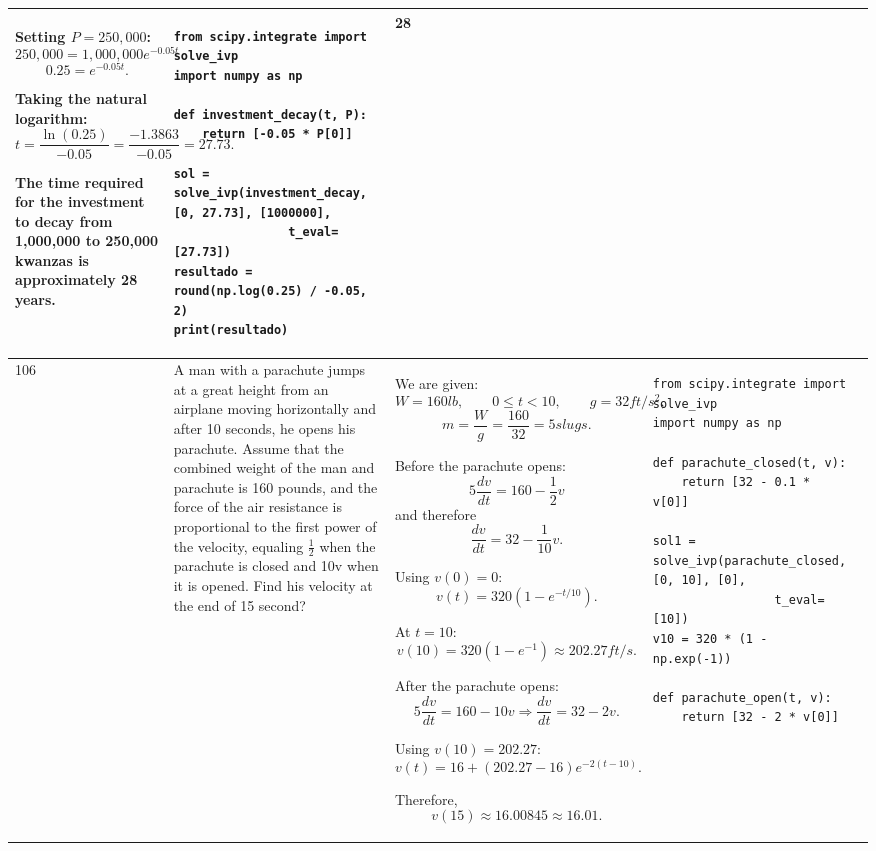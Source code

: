 \documentclass[a4paper,12pt]{article}
\begin{document}
\begin{longtable}{|p{0.3cm}|p{}|p{10cm}|p{}|p{1.5cm}|}
Setting \(P=250,000\):
\[
250,000=1,000,000e^{-0.05t}
\]
\[
0.25=e^{-0.05t}.
\]

Taking the natural logarithm:
\[
t=\frac{\ln(0.25)}{-0.05}
=\frac{-1.3863}{-0.05}
=27.73.
\]

The time required for the investment to decay from 1,000,000 to 250,000 kwanzas is approximately 28 years. &
\begin{verbatim}
from scipy.integrate import solve_ivp
import numpy as np

def investment_decay(t, P):
    return [-0.05 * P[0]]

sol = solve_ivp(investment_decay, [0, 27.73], [1000000],
                t_eval=[27.73])
resultado = round(np.log(0.25) / -0.05, 2)
print(resultado)
\end{verbatim}
& 28 \\ \hline

106 & A man with a parachute jumps at a great height from an airplane moving horizontally and after 10 seconds, he opens his parachute. Assume that the combined weight of the man and parachute is 160 pounds, and the force of the air resistance is proportional to the first power of the velocity, equaling $\frac{1}{2}$ when the parachute is closed and 10v when it is opened. Find his velocity at the end of 15 second? &
We are given:
\[
W=160lb,\qquad 0\leq t<10,\qquad g=32ft/s^2,
\]
\[
m=\frac{W}{g}=\frac{160}{32}=5slugs.
\]

Before the parachute opens:
\[
5\frac{dv}{dt}=160-\frac12v
\]
and therefore
\[
\frac{dv}{dt}=32-\frac{1}{10}v.
\]

Using \(v(0)=0\):
\[
v(t)=320(1-e^{-t/10}).
\]

At \(t=10\):
\[
v(10)=320(1-e^{-1})\approx202.27ft/s.
\]

After the parachute opens:
\[
5\frac{dv}{dt}=160-10v
\Rightarrow\frac{dv}{dt}=32-2v.
\]

Using \(v(10)=202.27\):
\[
v(t)=16+(202.27-16)e^{-2(t-10)}.
\]

Therefore,
\[
v(15)\approx16.00845\approx16.01.
\] &
\begin{verbatim}
from scipy.integrate import solve_ivp
import numpy as np

def parachute_closed(t, v):
    return [32 - 0.1 * v[0]]

sol1 = solve_ivp(parachute_closed, [0, 10], [0],
                 t_eval=[10])
v10 = 320 * (1 - np.exp(-1))

def parachute_open(t, v):
    return [32 - 2 * v[0]]


\end{verbatim}
\end{longtable}
\end{document}
